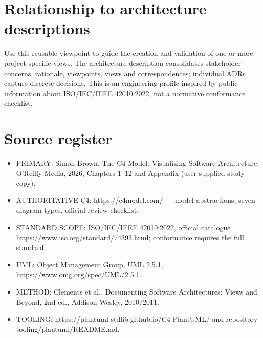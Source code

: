 \documentclass[10pt,letterpaper]{article}
\begin{document}
\section{Relationship to architecture descriptions}
Use this reusable viewpoint to guide the creation and validation of one or more project-specific views. The architecture description consolidates stakeholder concerns, rationale, viewpoints, views and correspondences; individual ADRs capture discrete decisions. This is an engineering profile inspired by public information about ISO/IEC/IEEE 42010:2022, not a normative conformance checklist.


\section{Source register}
\begin{itemize}
\item PRIMARY: Simon Brown, The C4 Model: Visualizing Software Architecture, O’Reilly Media, 2026, Chapters 1–12 and Appendix (user-supplied study copy).
\item AUTHORITATIVE C4: https://c4model.com/ — model abstractions, seven diagram types, official review checklist.
\item STANDARD SCOPE: ISO/IEC/IEEE 42010:2022, official catalogue https://www.iso.org/standard/74393.html; conformance requires the full standard.
\item UML: Object Management Group, UML 2.5.1, https://www.omg.org/spec/UML/2.5.1.
\item METHOD: Clements et al., Documenting Software Architectures: Views and Beyond, 2nd ed., Addison-Wesley, 2010/2011.
\item TOOLING: https://plantuml-stdlib.github.io/C4-PlantUML/ and repository tooling/plantuml/README.md.
\end{itemize}
\end{document}
